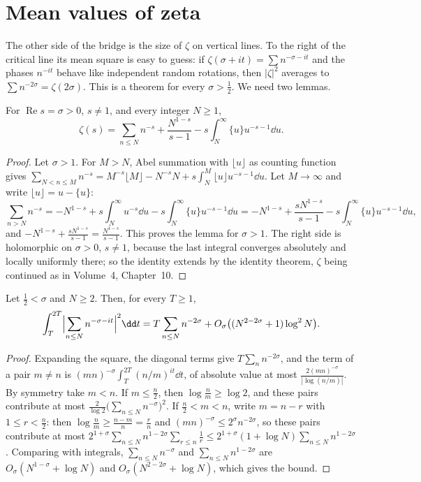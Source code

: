 \section{Mean values of zeta}

The other side of the bridge is the size of $\zeta$ on vertical lines. To the right of the critical line its mean square is easy to guess: if
$\zeta(\sigma+it)=\sum n^{-\sigma-it}$ and the phases $n^{-it}$ behave like independent random rotations, then $|\zeta|^2$ averages to
$\sum n^{-2\sigma}=\zeta(2\sigma)$. This is a theorem for every $\sigma>\frac12$. We need two lemmas.

\begin{lemma}\label{moments:lem:zetaapprox}
For $\operatorname{Re}s=\sigma>0$, $s\ne1$, and every integer $N\ge1$,
\[
\zeta(s)=\sum_{n\le N}n^{-s}+\frac{N^{1-s}}{s-1}-s\int_N^\infty\{u\}u^{-s-1}\dd u.
\]
\end{lemma}
\begin{proof}
Let $\sigma>1$. For $M>N$, Abel summation with $\lfloor u\rfloor$ as counting function gives
$\sum_{N<n\le M}n^{-s}=M^{-s}\lfloor M\rfloor-N^{-s}N+s\int_N^M\lfloor u\rfloor u^{-s-1}\dd u$. Let $M\to\infty$ and write $\lfloor u\rfloor=u-\{u\}$:
\[
\sum_{n>N}n^{-s}=-N^{1-s}+s\int_N^\infty u^{-s}\dd u-s\int_N^\infty\{u\}u^{-s-1}\dd u=-N^{1-s}+\frac{sN^{1-s}}{s-1}-s\int_N^\infty\{u\}u^{-s-1}\dd u,
\]
and $-N^{1-s}+\frac{sN^{1-s}}{s-1}=\frac{N^{1-s}}{s-1}$. This proves the lemma for $\sigma>1$. The right side is holomorphic on $\sigma>0$, $s\ne1$, because the last
integral converges absolutely and locally uniformly there; so the identity extends by the identity theorem, $\zeta$ being continued as in Volume~4,
Chapter~10.
\end{proof}

\begin{lemma}\label{moments:lem:dirmeanvalue}
Let $\frac12<\sigma$ and $N\ge2$. Then, for every $T\ge1$,
\[
\int_T^{2T}\Bigl|\sum_{n\le N}n^{-\sigma-it}\Bigr|^2\dd t=T\sum_{n\le N}n^{-2\sigma}+O_\sigma\bigl((N^{2-2\sigma}+1)\log^2N\bigr).
\]
\end{lemma}
\begin{proof}
Expanding the square, the diagonal terms give $T\sum_nn^{-2\sigma}$, and the term of a pair $m\ne n$ is $(mn)^{-\sigma}\int_T^{2T}(n/m)^{it}\dd t$, of absolute value at
most $\frac{2(mn)^{-\sigma}}{|\log(n/m)|}$. By symmetry take $m<n$. If $m\le\frac n2$, then $\log\frac nm\ge\log2$, and these pairs contribute at most
$\frac2{\log2}\bigl(\sum_{n\le N}n^{-\sigma}\bigr)^2$. If $\frac n2<m<n$, write $m=n-r$ with $1\le r<\frac n2$: then $\log\frac nm\ge\frac{n-m}n=\frac rn$ and
$(mn)^{-\sigma}\le2^\sigma n^{-2\sigma}$, so these pairs contribute at most $2^{1+\sigma}\sum_{n\le N}n^{1-2\sigma}\sum_{r\le n}\frac1r\le2^{1+\sigma}(1+\log N)\sum_{n\le N}n^{1-2\sigma}$.
Comparing with integrals, $\sum_{n\le N}n^{-\sigma}$ and $\sum_{n\le N}n^{1-2\sigma}$ are $O_\sigma(N^{1-\sigma}+\log N)$ and $O_\sigma(N^{2-2\sigma}+\log N)$, which gives the bound.
\end{proof}

